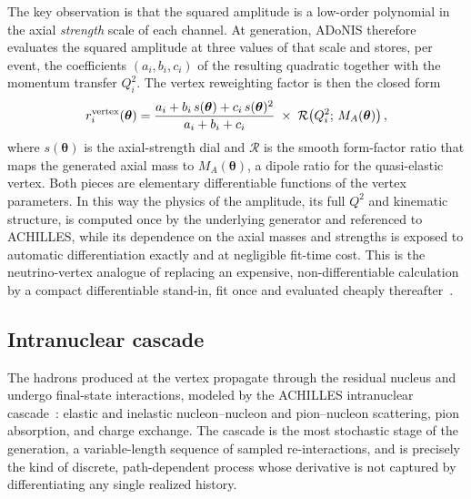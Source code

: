 \documentclass[aps,prd,reprint,superscriptaddress,nofootinbib,amsmath,amssymb,floatfix]{revtex4-1}
\newcommand{\adonis}{{ADoNIS}\xspace}
\begin{document}
The key observation is that the squared amplitude is a low-order polynomial in
the axial \emph{strength} scale of each channel. At generation, \adonis therefore
evaluates the squared amplitude at three values of that scale and stores, per
event, the coefficients $(a_i, b_i, c_i)$ of the resulting quadratic together
with the momentum transfer $Q^2_i$. The vertex reweighting factor is then the
closed form
\begin{equation}
r^{\rm vertex}_i(\bm\theta)
= \frac{a_i + b_i\,s(\bm\theta) + c_i\,s(\bm\theta)^2}{a_i + b_i + c_i}
\;\times\; \mathcal{R}\!\left(Q^2_i;\, M_A(\bm\theta)\right),
\end{equation}
where $s(\bm\theta)$ is the axial-strength dial and $\mathcal{R}$ is the smooth
form-factor ratio that maps the generated axial mass to $M_A(\bm\theta)$, a
dipole ratio for the quasi-elastic vertex. Both pieces are elementary
differentiable functions of the vertex parameters. In this way the physics of the
amplitude, its full $Q^2$ and kinematic structure, is computed once by the
underlying generator and referenced to ACHILLES, while its dependence on the
axial masses and strengths is exposed to automatic differentiation exactly and at
negligible fit-time cost. This is the neutrino-vertex analogue of replacing an
expensive, non-differentiable calculation by a compact differentiable stand-in,
fit once and evaluated cheaply thereafter~\cite{LUCiD}.

\subsection{Intranuclear cascade}
\label{sec:adonis_cascade}

The hadrons produced at the vertex propagate through the residual nucleus and
undergo final-state interactions, modeled by the ACHILLES intranuclear
cascade~\cite{Isaacson:2020wlx}: elastic and inelastic nucleon--nucleon and
pion--nucleon scattering, pion absorption, and charge exchange. The cascade is
the most stochastic stage of the generation, a variable-length sequence of
sampled re-interactions, and is precisely the kind of discrete, path-dependent
process whose derivative is not captured by differentiating any single realized
history.
\end{document}
